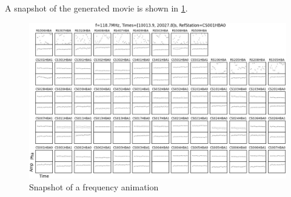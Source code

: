 \documentclass[a4paper,11pt]{article}
\begin{document}
A snapshot of the generated movie is shown in \ref{fig:freq}.

\begin{figure}[h]
  \centering
  \includegraphics[scale=0.52]{fig/freq} 
  \caption{Snapshot of a frequency animation}
  \label{fig:freq}
\end{figure}
\end{document}
